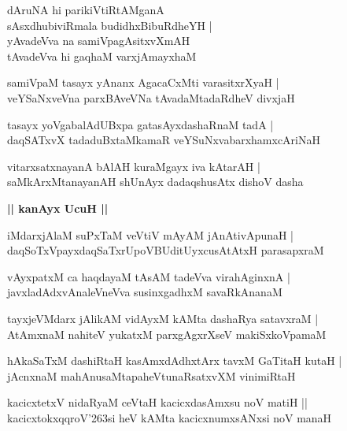 \documentclass[twoside,12pt,openright]{book}
\def\S{\char'263}
\newcounter{shloka}[chapter]
\def\uvaca#1{\centerline{{\large\textbf{#1}}}}
\begin{document}
\begin{shloka}
dAruNA hi parikiVtiRtAMganA\\
sAsxdhubiviRmala budidhxBibuRdheYH |\\
yAvadeVva na samiVpagAsitxvXmAH \\
tAvadeVva hi gaqhaM varxjAmayxhaM 
\end{shloka}

\begin{shloka}
samiVpaM tasayx yAnanx AgacaCxMti varasitxrXyaH |\\
veYSaNxveVna parxBAveVNa tAvadaMtadaRdheV divxjaH 
\end{shloka}

\begin{shloka}
tasayx yoVgabalAdUBxpa gatasAyxdashaRnaM tadA |\\
daqSATxvX tadaduBxtaMkamaR veYSuNxvabarxhamxcAriNaH 
\end{shloka}

\begin{shloka}
vitarxsatxnayanA bAlAH kuraMgayx iva kAtarAH |\\
saMkArxMtanayanAH shUnAyx dadaqshusAtx dishoV dasha
\end{shloka}

\uvaca{|| kanAyx UcuH ||}

\begin{shloka}
iMdarxjAlaM suPxTaM veVtiV mAyAM  jAnAtivApunaH |\\
daqSoTxVpayxdaqSaTxrUpoVBUditUyxcusAtAtxH parasapxraM 
\end{shloka}

\begin{shloka}
vAyxpatxM ca haqdayaM tAsAM tadeVva virahAginxnA |\\
javxladAdxvAnaleVneVva susinxgadhxM savaRkAnanaM 
\end{shloka}

\begin{shloka}
tayxjeVMdarx jAlikAM vidAyxM kAMta dashaRya satavxraM |\\
AtAmxnaM nahiteV yukatxM parxgAgxrXseV makiSxkoVpamaM
\end{shloka}

\begin{shloka}
hAkaSaTxM dashiRtaH kasAmxdAdhxtArx tavxM GaTitaH kutaH |\\
jAcnxnaM mahAnusaMtapaheVtunaRsatxvXM vinimiRtaH
\end{shloka}

\begin{shloka}
kacicxtetxV nidaRyaM ceVtaH kacicxdasAmxsu noV matiH ||\\
kacicxtokxqqroV\S si heV kAMta kacicxnumxsANxsi noV manaH 
\end{shloka}
\end{document}
